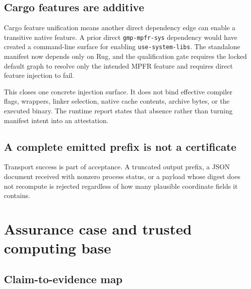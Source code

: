 \documentclass[11pt]{article}
\theoremstyle{definition}
\begin{document}
\subsection{Cargo features are additive}

Cargo feature unification means another direct dependency edge can enable a transitive native
feature.  A prior direct \texttt{gmp-mpfr-sys} dependency would have created a command-line surface
for enabling \texttt{use-system-libs}.  The standalone manifest now depends only on Rug, and the
qualification gate requires the locked default graph to resolve only the intended MPFR feature
and requires direct feature injection to fail.

This closes one concrete injection surface.  It does not bind effective compiler flags, wrappers,
linker selection, native cache contents, archive bytes, or the executed binary.  The runtime report
states that absence rather than turning manifest intent into an attestation.

\subsection{A complete emitted prefix is not a certificate}

Transport success is part of acceptance.  A truncated output prefix, a JSON document received
with nonzero process status, or a payload whose digest does not recompute is rejected regardless
of how many plausible coordinate fields it contains.

\section{Assurance case and trusted computing base}

\subsection{Claim-to-evidence map}
\end{document}
